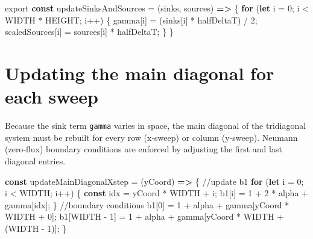\documentclass[
  letterpaper,
  DIV=11,
  numbers=noendperiod]{scrreprt}
\newenvironment{Shaded}{\begin{snugshade}}{\end{snugshade}}
\newcommand{\CommentTok}[1]{\textcolor[rgb]{0.37,0.37,0.37}{#1}}
\newcommand{\ControlFlowTok}[1]{\textcolor[rgb]{0.00,0.23,0.31}{\textbf{#1}}}
\newcommand{\DecValTok}[1]{\textcolor[rgb]{0.68,0.00,0.00}{#1}}
\newcommand{\ImportTok}[1]{\textcolor[rgb]{0.00,0.46,0.62}{#1}}
\newcommand{\KeywordTok}[1]{\textcolor[rgb]{0.00,0.23,0.31}{\textbf{#1}}}
\newcommand{\NormalTok}[1]{\textcolor[rgb]{0.00,0.23,0.31}{#1}}
\newcommand{\OperatorTok}[1]{\textcolor[rgb]{0.37,0.37,0.37}{#1}}
\begin{document}
\label{adi-update-sinks-sources}%
\begin{Shaded}
\begin{Highlighting}[]
\ImportTok{export} \KeywordTok{const}\NormalTok{ updateSinksAndSources }\OperatorTok{=}\NormalTok{ (sinks}\OperatorTok{,}\NormalTok{ sources) }\KeywordTok{=\textgreater{}}\NormalTok{ \{}
    \ControlFlowTok{for}\NormalTok{ (}\KeywordTok{let}\NormalTok{ i }\OperatorTok{=} \DecValTok{0}\OperatorTok{;}\NormalTok{ i }\OperatorTok{\textless{}}\NormalTok{ WIDTH }\OperatorTok{*}\NormalTok{ HEIGHT}\OperatorTok{;}\NormalTok{ i}\OperatorTok{++}\NormalTok{) \{}
\NormalTok{        gamma[i] }\OperatorTok{=}\NormalTok{ (sinks[i] }\OperatorTok{*}\NormalTok{ halfDeltaT) }\OperatorTok{/} \DecValTok{2}\OperatorTok{;}
\NormalTok{        scaledSources[i] }\OperatorTok{=}\NormalTok{ sources[i] }\OperatorTok{*}\NormalTok{ halfDeltaT}\OperatorTok{;}
\NormalTok{    \}}
\NormalTok{\}}
\end{Highlighting}
\end{Shaded}

\section{Updating the main diagonal for each
sweep}\label{updating-the-main-diagonal-for-each-sweep}

Because the sink term \texttt{gamma} varies in space, the main diagonal
of the tridiagonal system must be rebuilt for every row (x‑sweep) or
column (y‑sweep). Neumann (zero‑flux) boundary conditions are enforced
by adjusting the first and last diagonal entries.

\label{adi-update-diagonal-x}%
\begin{Shaded}
\begin{Highlighting}[]
\KeywordTok{const}\NormalTok{ updateMainDiagonalXstep }\OperatorTok{=}\NormalTok{ (yCoord) }\KeywordTok{=\textgreater{}}\NormalTok{ \{}
    \CommentTok{//update b1}
    \ControlFlowTok{for}\NormalTok{ (}\KeywordTok{let}\NormalTok{ i }\OperatorTok{=} \DecValTok{0}\OperatorTok{;}\NormalTok{ i }\OperatorTok{\textless{}}\NormalTok{ WIDTH}\OperatorTok{;}\NormalTok{ i}\OperatorTok{++}\NormalTok{) \{}
        \KeywordTok{const}\NormalTok{ idx }\OperatorTok{=}\NormalTok{ yCoord }\OperatorTok{*}\NormalTok{ WIDTH }\OperatorTok{+}\NormalTok{ i}\OperatorTok{;}
\NormalTok{        b1[i] }\OperatorTok{=} \DecValTok{1} \OperatorTok{+} \DecValTok{2} \OperatorTok{*}\NormalTok{ alpha }\OperatorTok{+}\NormalTok{ gamma[idx]}\OperatorTok{;}
\NormalTok{    \}}
    \CommentTok{//boundary conditions}
\NormalTok{    b1[}\DecValTok{0}\NormalTok{] }\OperatorTok{=} \DecValTok{1} \OperatorTok{+}\NormalTok{ alpha }\OperatorTok{+}\NormalTok{ gamma[yCoord }\OperatorTok{*}\NormalTok{ WIDTH }\OperatorTok{+} \DecValTok{0}\NormalTok{]}\OperatorTok{;}
\NormalTok{    b1[WIDTH }\OperatorTok{{-}} \DecValTok{1}\NormalTok{] }\OperatorTok{=} \DecValTok{1} \OperatorTok{+}\NormalTok{ alpha }\OperatorTok{+}\NormalTok{ gamma[yCoord }\OperatorTok{*}\NormalTok{ WIDTH }\OperatorTok{+}\NormalTok{ (WIDTH }\OperatorTok{{-}} \DecValTok{1}\NormalTok{)]}\OperatorTok{;}
\NormalTok{\}}
\end{Highlighting}
\end{Shaded}
\end{document}

